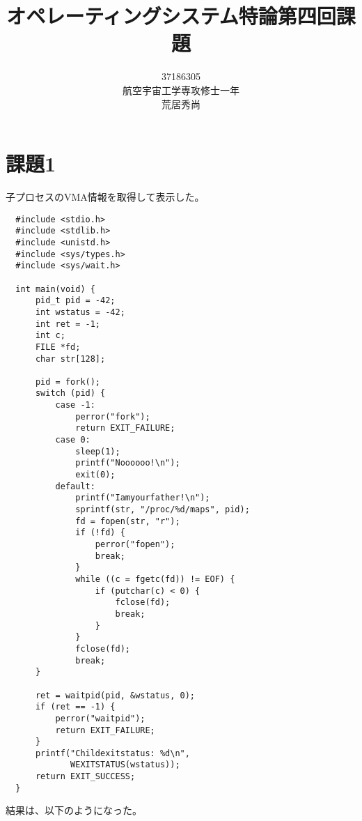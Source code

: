 \documentclass[10pt,a4paper]{ltjsarticle}       %
\title{オペレーティングシステム特論第四回課題}
\author{37186305\\航空宇宙工学専攻修士一年\\荒居秀尚}
\begin{document}
  \maketitle
  \section{課題1}
  子プロセスのVMA情報を取得して表示した。
  \begin{lstlisting}
  #include <stdio.h>
  #include <stdlib.h>
  #include <unistd.h>
  #include <sys/types.h>
  #include <sys/wait.h>

  int main(void) {
      pid_t pid = -42;
      int wstatus = -42;
      int ret = -1;
      int c;
      FILE *fd;
      char str[128];

      pid = fork();
      switch (pid) {
          case -1:
              perror("fork");
              return EXIT_FAILURE;
          case 0:
              sleep(1);
              printf("Noooooo!\n");
              exit(0);
          default:
              printf("Iamyourfather!\n");
              sprintf(str, "/proc/%d/maps", pid);
              fd = fopen(str, "r");
              if (!fd) {
                  perror("fopen");
                  break;
              }
              while ((c = fgetc(fd)) != EOF) {
                  if (putchar(c) < 0) {
                      fclose(fd);
                      break;
                  }
              }
              fclose(fd);
              break;
      }

      ret = waitpid(pid, &wstatus, 0);
      if (ret == -1) {
          perror("waitpid");
          return EXIT_FAILURE;
      }
      printf("Childexitstatus: %d\n",
             WEXITSTATUS(wstatus));
      return EXIT_SUCCESS;
  }
  \end{lstlisting}
  結果は、以下のようになった。
\end{document}
